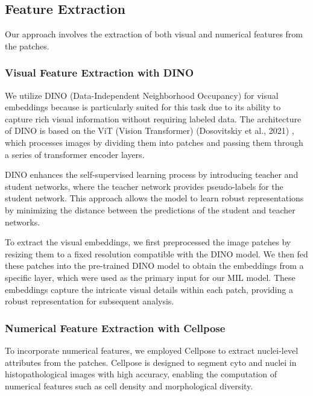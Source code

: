 \documentclass[10pt,twocolumn]{article}
\begin{document}
\subsection{Feature Extraction}

Our approach involves the extraction of both visual and numerical features from the patches.

\subsubsection{Visual Feature Extraction with DINO}

We utilize DINO (Data-Independent Neighborhood Occupancy) for visual embeddings because is particularly suited for this task due to its ability to capture rich visual information without requiring labeled data. The architecture of DINO is based on the ViT (Vision Transformer) (Dosovitskiy et al., 2021) \cite{dosovitskiy2021imageworth16x16words}, which processes images by dividing them into patches and passing them through a series of transformer encoder layers. 

DINO enhances the self-supervised learning process by introducing teacher and student networks, where the teacher network provides pseudo-labels for the student network. This approach allows the model to learn robust representations by minimizing the distance between the predictions of the student and teacher networks. 

To extract the visual embeddings, we first preprocessed the image patches by resizing them to a fixed resolution compatible with the DINO model. We then fed these patches into the pre-trained DINO model to obtain the embeddings from a specific layer, which were used as the primary input for our MIL model. These embeddings capture the intricate visual details within each patch, providing a robust representation for subsequent analysis.



\subsubsection{Numerical Feature Extraction with Cellpose}

To incorporate numerical features, we employed Cellpose to extract nuclei-level attributes from the patches. Cellpose is designed to segment cyto and nuclei in histopathological images with high accuracy, enabling the computation of numerical features such as cell density and morphological diversity.
\end{document}
